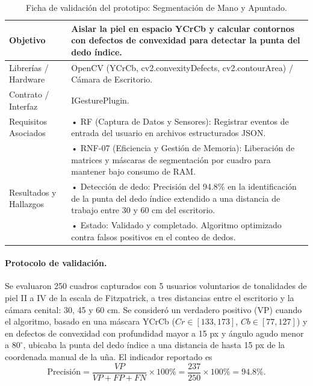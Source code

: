 \begin{table}[H]
    \centering
    \caption{Ficha de validación del prototipo: Segmentación de Mano y Apuntado.}
    \label{tab:ficha_f6}
    \begin{tabular}{L{3.2cm} L{11.0cm}}
        \toprule
        Objetivo & Aislar la piel en espacio YCrCb y calcular contornos con defectos de convexidad para detectar la punta del dedo índice. \\ \midrule
        Librerías / Hardware & OpenCV (YCrCb, cv2.convexityDefects, cv2.contourArea) / Cámara de Escritorio. \\ \midrule
        Contrato / Interfaz & IGesturePlugin. \\ \midrule
        Requisitos Asociados &
        • RF (Captura de Datos y Sensores): Registrar eventos de entrada del usuario en archivos estructurados JSON. \vspace{0.1cm} \\
        & • RNF-07 (Eficiencia y Gestión de Memoria): Liberación de matrices y máscaras de segmentación por cuadro para mantener bajo consumo de RAM. \\ \midrule
        Resultados y Hallazgos &
        • Detección de dedo: Precisión del 94.8\% en la identificación de la punta del dedo índice extendido a una distancia de trabajo entre 30 y 60 cm del escritorio. \vspace{0.1cm} \\
        & • Estado: Validado y completado. Algoritmo optimizado contra falsos positivos en el conteo de dedos. \\ \bottomrule
    \end{tabular}
\end{table}
 
\paragraph{Protocolo de validación.} Se evaluaron 250 cuadros capturados con 5 usuarios voluntarios de tonalidades de piel II a IV de la escala de Fitzpatrick, a tres distancias entre el escritorio y la cámara cenital: 30, 45 y 60 cm. Se consideró un verdadero positivo (VP) cuando el algoritmo, basado en una máscara YCrCb ($Cr \in [133, 173]$, $Cb \in [77, 127]$) y en defectos de convexidad con profundidad mayor a 15 px y ángulo agudo menor a $80^\circ$, ubicaba la punta del dedo índice a una distancia de hasta 15 px de la coordenada manual de la uña. El indicador reportado es
\[ \mathrm{Precisión} = \frac{VP}{VP + FP + FN} \times 100\% = \frac{237}{250} \times 100\% = 94.8\%. \]
 
